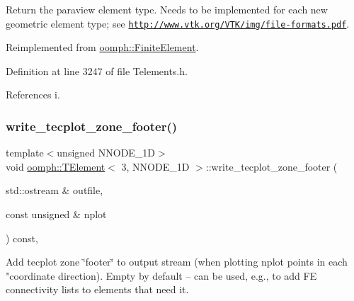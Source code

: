 Return the paraview element type. Needs to be implemented for each new geometric element type; see \href{http://www.vtk.org/VTK/img/file-formats.pdf}{\tt http\+://www.\+vtk.\+org/\+V\+T\+K/img/file-\/formats.\+pdf}. 



Reimplemented from \hyperlink{classoomph_1_1FiniteElement_a68f0f8dc76f04e7d69983ec711b4ab08}{oomph\+::\+Finite\+Element}.



Definition at line 3247 of file Telements.\+h.



References i.

\mbox{\label{classoomph_1_1TElement_3_013_00_01NNODE__1D_01_4_a4f5aece48d3f6a77c494b3aa42b5cc7a}} 
\subsubsection{\texorpdfstring{write\+\_\+tecplot\+\_\+zone\+\_\+footer()}{write\_tecplot\_zone\_footer()}\hspace{0.1cm}{\footnotesize\ttfamily [1/2]}}
{\footnotesize\ttfamily template$<$unsigned N\+N\+O\+D\+E\+\_\+1D$>$ \\
void \hyperlink{classoomph_1_1TElement}{oomph\+::\+T\+Element}$<$ 3, N\+N\+O\+D\+E\+\_\+1D $>$\+::write\+\_\+tecplot\+\_\+zone\+\_\+footer (\begin{DoxyParamCaption}\item[{std\+::ostream \&}]{outfile,  }\item[{const unsigned \&}]{nplot }\end{DoxyParamCaption}) const\hspace{0.3cm}{\ttfamily [inline]}, {\ttfamily [virtual]}}



Add tecplot zone \char`\"{}footer\char`\"{} to output stream (when plotting nplot points in each "coordinate direction). Empty by default -- can be used, e.\+g., to add FE connectivity lists to elements that need it. 



